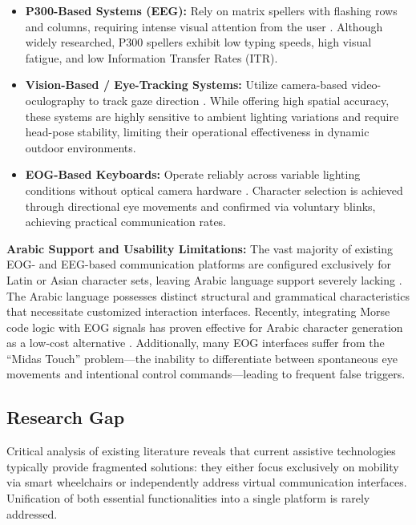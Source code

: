 \begin{itemize}
    \item \textbf{P300-Based Systems (EEG):} Rely on matrix spellers with flashing rows and columns, requiring intense visual attention from the user \cite{kabbara2015efficient}. Although widely researched, P300 spellers exhibit low typing speeds, high visual fatigue, and low Information Transfer Rates (ITR).
    \item \textbf{Vision-Based / Eye-Tracking Systems:} Utilize camera-based video-oculography to track gaze direction \cite{eyedriven2026review}. While offering high spatial accuracy, these systems are highly sensitive to ambient lighting variations and require head-pose stability, limiting their operational effectiveness in dynamic outdoor environments.
    \item \textbf{EOG-Based Keyboards:} Operate reliably across variable lighting conditions without optical camera hardware \cite{kumar2016eog, preetha2025realtime}. Character selection is achieved through directional eye movements and confirmed via voluntary blinks, achieving practical communication rates.
\end{itemize}

\textbf{Arabic Support and Usability Limitations:} The vast majority of existing EOG- and EEG-based communication platforms are configured exclusively for Latin or Asian character sets, leaving Arabic language support severely lacking \cite{kabbara2015efficient, alzahrani2026design}. The Arabic language possesses distinct structural and grammatical characteristics that necessitate customized interaction interfaces. Recently, integrating Morse code logic with EOG signals has proven effective for Arabic character generation as a low-cost alternative \cite{alzahrani2026design}. Additionally, many EOG interfaces suffer from the ``Midas Touch'' problem---the inability to differentiate between spontaneous eye movements and intentional control commands---leading to frequent false triggers.

\FloatBarrier
\subsection{Research Gap}
\label{subsec:research_gap}

Critical analysis of existing literature reveals that current assistive technologies typically provide fragmented solutions: they either focus exclusively on mobility via smart wheelchairs or independently address virtual communication interfaces. Unification of both essential functionalities into a single platform is rarely addressed.

